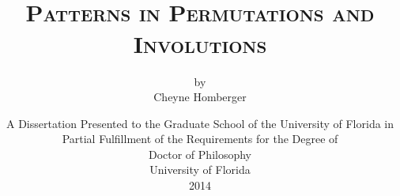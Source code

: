 
\pretitle{ \begin{center}}
\title{\vspace{-6pc} \hrulefill \\ {\scshape \LARGE Patterns in Permutations and
    Involutions\\[6pt]}}
\author{{\small by} \\[4pc] Cheyne Homberger}
\predate{\vfill\begin{center}\normalsize}


\date{\vspace{4pc} A Dissertation Presented to the Graduate School of the University
of Florida in Partial Fulfillment of the Requirements for the Degree of \\
Doctor of Philosophy \\[1pc]
University of Florida \\[1pc]
2014}
\maketitle
\thispagestyle{empty}
